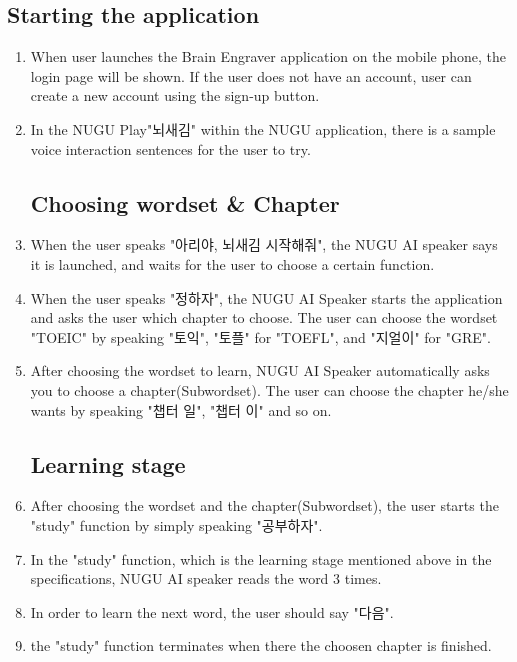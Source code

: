 \documentclass[conference]{IEEEtran}
\begin{document}
    \subsection{Starting the application}
    \begin{enumerate}
        \item When user launches the Brain Engraver application on the mobile phone, the login page will be shown. If the user does not have an account, user can create a new account using the sign-up button.
        \item In the NUGU Play"뇌새김" within the NUGU application, there is a sample voice interaction sentences for the user to try.
    \subsection{Choosing wordset \& Chapter}
        \item When the user speaks "아리야, 뇌새김 시작해줘", the NUGU AI speaker says it is launched, and waits for the user to choose a certain function.
        \item When the user speaks "정하자", the NUGU AI Speaker starts the application and asks the user which chapter to choose. The user can choose the wordset "TOEIC" by speaking "토익", "토플" for "TOEFL", and "지얼이" for "GRE".
        \item After choosing the wordset to learn, NUGU AI Speaker automatically asks you to choose a chapter(Subwordset). The user can choose the chapter he/she wants by speaking "챕터 일", "챕터 이" and so on.
    \subsection{Learning stage}
        \item After choosing the wordset and the chapter(Subwordset), the user starts the "study" function by simply speaking "공부하자".
        \item In the "study" function, which is the learning stage mentioned above in the specifications, NUGU AI speaker reads the word 3 times.
        \item In order to learn the next word, the user should say "다음".
        \item the "study" function terminates when there the choosen chapter is finished.
        

\end{enumerate}
\end{document}
